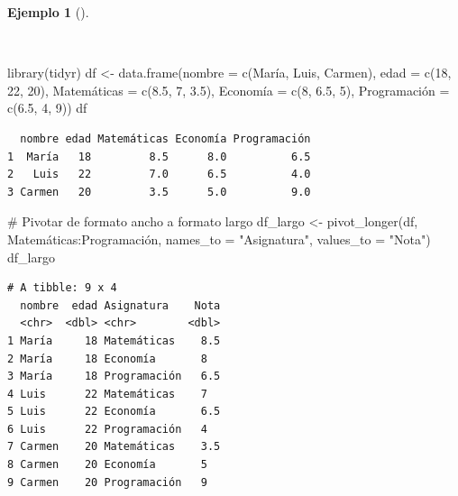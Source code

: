 \documentclass[
  spanish,
  a4paper,
]{scrreport}
\newenvironment{Shaded}{\begin{snugshade}}{\end{snugshade}}
\newcommand{\AttributeTok}[1]{\textcolor[rgb]{0.40,0.45,0.13}{#1}}
\newcommand{\CommentTok}[1]{\textcolor[rgb]{0.37,0.37,0.37}{#1}}
\newcommand{\DecValTok}[1]{\textcolor[rgb]{0.68,0.00,0.00}{#1}}
\newcommand{\FloatTok}[1]{\textcolor[rgb]{0.68,0.00,0.00}{#1}}
\newcommand{\FunctionTok}[1]{\textcolor[rgb]{0.28,0.35,0.67}{#1}}
\newcommand{\NormalTok}[1]{\textcolor[rgb]{0.00,0.23,0.31}{#1}}
\newcommand{\OtherTok}[1]{\textcolor[rgb]{0.00,0.23,0.31}{#1}}
\newcommand{\SpecialCharTok}[1]{\textcolor[rgb]{0.37,0.37,0.37}{#1}}
\newcommand{\StringTok}[1]{\textcolor[rgb]{0.13,0.47,0.30}{#1}}
\theoremstyle{definition}
\theoremstyle{definition}
\newtheorem{example}{Ejemplo}[chapter]
\theoremstyle{remark}
\begin{document}
\begin{example}[]\protect\hypertarget{exm-pivotar-formato-ancho-a-largo}{}\label{exm-pivotar-formato-ancho-a-largo}

~

\begin{Shaded}
\begin{Highlighting}[]
\FunctionTok{library}\NormalTok{(tidyr)}
\NormalTok{df }\OtherTok{\textless{}{-}} \FunctionTok{data.frame}\NormalTok{(}\AttributeTok{nombre =} \FunctionTok{c}\NormalTok{(}\StringTok{\textquotesingle{}María\textquotesingle{}}\NormalTok{, }\StringTok{\textquotesingle{}Luis\textquotesingle{}}\NormalTok{, }\StringTok{\textquotesingle{}Carmen\textquotesingle{}}\NormalTok{), }
\AttributeTok{edad =} \FunctionTok{c}\NormalTok{(}\DecValTok{18}\NormalTok{, }\DecValTok{22}\NormalTok{, }\DecValTok{20}\NormalTok{), }
\NormalTok{Matemáticas }\OtherTok{=} \FunctionTok{c}\NormalTok{(}\FloatTok{8.5}\NormalTok{, }\DecValTok{7}\NormalTok{, }\FloatTok{3.5}\NormalTok{),}
\NormalTok{Economía }\OtherTok{=} \FunctionTok{c}\NormalTok{(}\DecValTok{8}\NormalTok{, }\FloatTok{6.5}\NormalTok{, }\DecValTok{5}\NormalTok{),}
\NormalTok{Programación }\OtherTok{=} \FunctionTok{c}\NormalTok{(}\FloatTok{6.5}\NormalTok{, }\DecValTok{4}\NormalTok{, }\DecValTok{9}\NormalTok{))}
\NormalTok{df}
\end{Highlighting}
\end{Shaded}

\begin{verbatim}
  nombre edad Matemáticas Economía Programación
1  María   18         8.5      8.0          6.5
2   Luis   22         7.0      6.5          4.0
3 Carmen   20         3.5      5.0          9.0
\end{verbatim}

\begin{Shaded}
\begin{Highlighting}[]
\CommentTok{\# Pivotar de formato ancho a formato largo}
\NormalTok{df\_largo }\OtherTok{\textless{}{-}} \FunctionTok{pivot\_longer}\NormalTok{(df, Matemáticas}\SpecialCharTok{:}\NormalTok{Programación, }\AttributeTok{names\_to =} \StringTok{"Asignatura"}\NormalTok{, }\AttributeTok{values\_to =} \StringTok{"Nota"}\NormalTok{)}
\NormalTok{df\_largo}
\end{Highlighting}
\end{Shaded}

\begin{verbatim}
# A tibble: 9 x 4
  nombre  edad Asignatura    Nota
  <chr>  <dbl> <chr>        <dbl>
1 María     18 Matemáticas    8.5
2 María     18 Economía       8  
3 María     18 Programación   6.5
4 Luis      22 Matemáticas    7  
5 Luis      22 Economía       6.5
6 Luis      22 Programación   4  
7 Carmen    20 Matemáticas    3.5
8 Carmen    20 Economía       5  
9 Carmen    20 Programación   9  
\end{verbatim}


\end{example}
\end{document}
